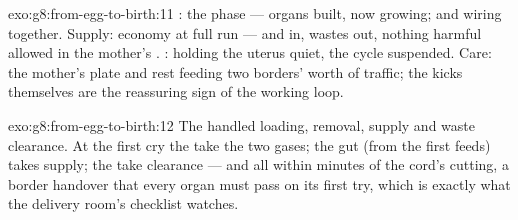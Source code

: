 \begin{solution}{exo:g8:from-egg-to-birth:11}
: the  phase --- organs built, now growing;
 and   wiring together. Supply: 
economy at full run ---  and  in, wastes
out, nothing harmful allowed in the mother's .
: holding the uterus quiet, the cycle suspended.
Care: the mother's plate and rest feeding two borders'
worth of traffic; the kicks themselves are the reassuring
sign of the working loop.
\end{solution}

\begin{solution}{exo:g8:from-egg-to-birth:12}
The  handled  loading, 
removal,  supply and waste clearance. At the
first cry the  take the two gases; the gut (from the
first feeds) takes supply; the  take clearance ---
and all within minutes of the cord's cutting, a border
handover that every organ must pass on its first try,
which is exactly what the delivery room's checklist
watches.
\end{solution}

